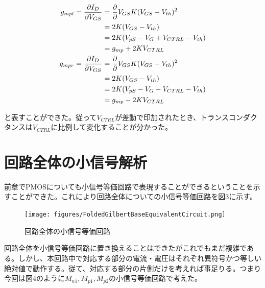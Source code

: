 \documentclass[twocolumn]{jsarticle}
\begin{document}
\begin{align}
    g_{mpl} = \frac{\partial I_{D}}{\partial V_{GS}} &= \frac{\partial}{\partial }V_{GS} K(V_{GS}-V_{th})^{2} \notag\\
    &=2K(V_{GS}-V_{th})    \notag\\ 
    &=2K(V_{pS}-V_{G}+V_{CTRL}-V_{th})  \notag\\
    &=g_{mp}+2KV_{CTRL}   \label{eq:g_mpl}\\
    g_{mpr} = \frac{\partial I_{D}}{\partial V_{GS}} &= \frac{\partial}{\partial }V_{GS} K(V_{GS}-V_{th})^{2} \notag\\
    &=2K(V_{GS}-V_{th})    \notag\\ 
    &=2K(V_{pS}-V_{G}-V_{CTRL}-V_{th})  \notag\\
    &=g_{mp}-2KV_{CTRL}   \label{eq:g_mpr}
\end{align}

と表すことができた。従って$V_{CTRL}$が差動で印加されたとき、トランスコンダクタンスは$V_{CTRL}$に比例して変化することが分かった。

\section{回路全体の小信号解析}
前章でPMOSについても小信号等価回路で表現することができるということを示すことができた。これにより回路全体についての小信号等価回路を図3に示す。

\begin{figure}[b]
    \begin{center}
        \texttt{[image: figures/FoldedGilbertBaseEquivalentCircuit.png]}
        \caption{回路全体の小信号等価回路}
    \end{center}
\end{figure}

回路全体を小信号等価回路に置き換えることはできたがこれでもまだ複雑である。しかし、本回路中で対応する部分の電流・電圧はそれぞれ異符号かつ等しい絶対値で動作する。従て、対応する部分の片側だけを考えれば事足りる。つまり今回は図4のように$M_{n1},M_{p1},M_{p2}$の小信号等価回路で考えた。
\end{document}
